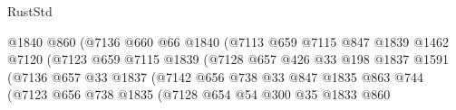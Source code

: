 \begin{lexlean}{RustStd}
\begin{coremodule}
                                          @1840
                                          @860
                                          (@7136
                                            @660
                                            @66
                                            @1840
                                            (@7113
                                              @659
                                              @7115
                                              @847
                                              @1839
                                              @1462
                                              @7120
                                              (@7123
                                                @659
                                                @7115
                                                @1839
                                                (@7128
                                                  @657
                                                  @426
                                                  @33
                                                  @198
                                                  @1837
                                                  @1591
                                                  (@7136
                                                    @657
                                                    @33
                                                    @1837
                                                    (@7142
                                                      @656
                                                      @738
                                                      @33
                                                      @847
                                                      @1835
                                                      @863
                                                      @744
                                                      (@7123
                                                        @656
                                                        @738
                                                        @1835
                                                        (@7128
                                                          @654
                                                          @54
                                                          @300
                                                          @35
                                                          @1833
                                                          @860

\end{coremodule}
\end{lexlean}
